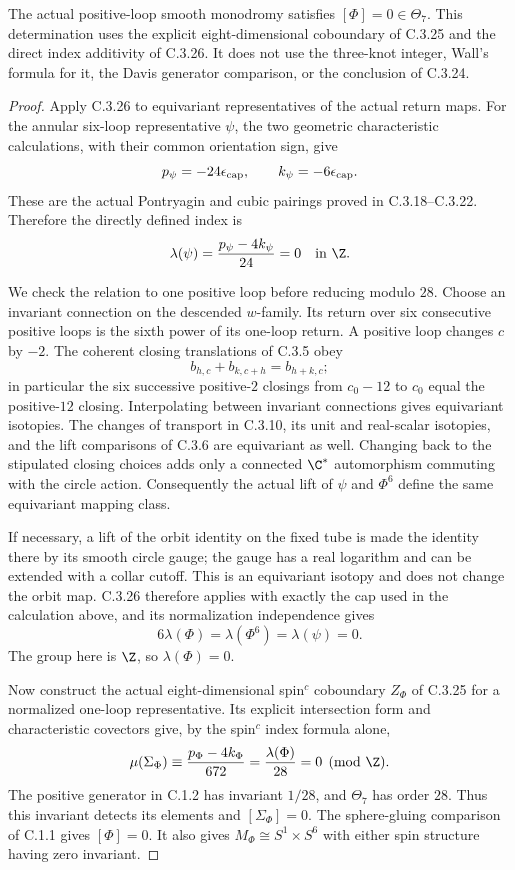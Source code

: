 \begin{corollary}
The actual positive-loop smooth monodromy satisfies
$[\Phi]=0\in\Theta_7$. This determination uses the explicit
eight-dimensional coboundary of C.3.25 and the direct index
additivity of C.3.26. It does not use the three-knot integer,
Wall's formula for it, the Davis generator comparison, or the
conclusion of C.3.24.
\end{corollary}
\begin{proof}
Apply C.3.26 to equivariant representatives of the actual return
maps. For the annular six-loop representative $\psi$, the two
geometric characteristic calculations, with their common
orientation sign, give
\[
 p_\psi=-24\epsilon_{\rm cap},\qquad
 k_\psi=-6\epsilon_{\rm cap}.
\]
These are the actual Pontryagin and cubic pairings proved in
C.3.18--C.3.22. Therefore the directly defined index is
\[
 \lambda(\psi)=\frac{p_\psi-4k_\psi}{24}=0
 \quad\hbox{in }\Z.
\]

We check the relation to one positive loop before reducing
modulo $28$. Choose an invariant connection on the descended
$w$-family. Its return over six consecutive positive loops is
the sixth power of its one-loop return. A positive loop changes
$c$ by $-2$. The coherent closing translations of C.3.5 obey
\[
 b_{h,c}+b_{k,c+h}=b_{h+k,c};
\]
in particular the six successive positive-$2$ closings from
$c_0-12$ to $c_0$ equal the positive-$12$ closing. Interpolating
between invariant connections gives equivariant isotopies.
The changes of transport in C.3.10, its unit and real-scalar
isotopies, and the lift comparisons of C.3.6 are equivariant
as well. Changing back to the stipulated closing choices
adds only a connected $\C^*$ automorphism commuting with the
circle action. Consequently the actual lift of $\psi$ and
$\Phi^6$ define the same equivariant mapping class.

If necessary, a lift of the orbit identity on the fixed tube
is made the identity there by its smooth circle gauge; the
gauge has a real logarithm and can be extended with a collar
cutoff. This is an equivariant isotopy and does not change the
orbit map. C.3.26 therefore applies with exactly the cap used
in the calculation above, and its normalization independence
gives
\[
 6\lambda(\Phi)=\lambda(\Phi^6)=\lambda(\psi)=0.
\]
The group here is $\Z$, so $\lambda(\Phi)=0$.

Now construct the actual eight-dimensional spin$^c$ coboundary
$Z_\Phi$ of C.3.25 for a normalized one-loop representative.
Its explicit intersection form and characteristic covectors
give, by the spin$^c$ index formula alone,
\[
 \mu(\Sigma_\Phi)
   \equiv\frac{p_\Phi-4k_\Phi}{672}
   =\frac{\lambda(\Phi)}{28}=0\pmod\Z.
\]
The positive generator in C.1.2 has invariant $1/28$, and
$\Theta_7$ has order $28$. Thus this invariant detects its
elements and $[\Sigma_\Phi]=0$. The sphere-gluing comparison
of C.1.1 gives $[\Phi]=0$. It also gives
$M_\Phi\cong S^1\times S^6$ with either spin structure having
zero invariant.
\end{proof}

